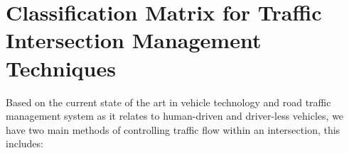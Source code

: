 \documentclass{book}
\begin{document}



\section{Classification Matrix for Traffic Intersection Management Techniques} Based on the current state of the art in vehicle technology and road traffic management system as it relates to human-driven and driver-less vehicles, we have two main methods of controlling traffic flow within an intersection, this includes:\\
\end{document}
